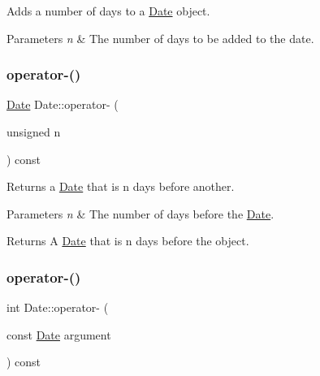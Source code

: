 Adds a number of days to a \hyperlink{classDate}{Date} object. 


\begin{DoxyParams}{Parameters}
{\em n} & The number of days to be added to the date. \\
\hline
\end{DoxyParams}
\mbox{\label{classDate_a66aee7889e49204ad68619efa5a3b2cc}} 
\subsubsection{\texorpdfstring{operator-\/()}{operator-()}\hspace{0.1cm}{\footnotesize\ttfamily [1/2]}}
{\footnotesize\ttfamily \hyperlink{classDate}{Date} Date\+::operator-\/ (\begin{DoxyParamCaption}\item[{unsigned}]{n }\end{DoxyParamCaption}) const}



Returns a \hyperlink{classDate}{Date} that is n days before another. 


\begin{DoxyParams}{Parameters}
{\em n} & The number of days before the \hyperlink{classDate}{Date}. \\
\hline
\end{DoxyParams}
\begin{DoxyReturn}{Returns}
A \hyperlink{classDate}{Date} that is n days before the object. 
\end{DoxyReturn}
\mbox{\label{classDate_a65012b4e9136060e962de596bcb51017}} 
\subsubsection{\texorpdfstring{operator-\/()}{operator-()}\hspace{0.1cm}{\footnotesize\ttfamily [2/2]}}
{\footnotesize\ttfamily int Date\+::operator-\/ (\begin{DoxyParamCaption}\item[{const \hyperlink{classDate}{Date}}]{argument }\end{DoxyParamCaption}) const}



